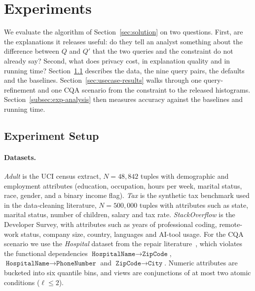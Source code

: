 \section{Experiments}
\label{sec:experiments}
\label{sec:usecases}

We evaluate the algorithm of Section~\ref{sec:solution} on two questions.
First, are the explanations it releases useful: do they tell an analyst something about the difference between $Q$ and $Q'$ that the two queries and the constraint do not already say?
Second, what does privacy cost, in explanation quality and in running time?
Section~\ref{subsec:exp-setup} describes the data, the nine query pairs, the defaults and the baselines.
Section~\ref{sec:usecase-results} walks through one query-refinement and one CQA scenario from the constraint to the released histograms.
Section~\ref{subsec:exp-analysis} then measures accuracy against the baselines and running time.

\subsection{Experiment Setup}
\label{subsec:exp-setup}

\paragraph{Datasets.}
\emph{Adult} is the UCI census extract, $N=48{,}842$ tuples with demographic and employment attributes (education, occupation, hours per week, marital status, race, gender, and a binary income flag).
\emph{Tax} is the synthetic tax benchmark used in the data-cleaning literature, $N=500{,}000$ tuples with attributes such as state, marital status, number of children, salary and tax rate.
\emph{StackOverflow} is the Developer Survey, with attributes such as years of professional coding, remote-work status, company size, country, languages and AI-tool usage.
For the CQA scenario we use the \emph{Hospital} dataset from the repair literature~\cite{rekatsinas2017}, which violates the functional dependencies $\texttt{HospitalName}\rightarrow\texttt{ZipCode}$, $\texttt{HospitalName}\rightarrow\texttt{PhoneNumber}$ and $\texttt{ZipCode}\rightarrow\texttt{City}$.
Numeric attributes are bucketed into six quantile bins, and views are conjunctions of at most two atomic conditions ($\ell\le2$).

